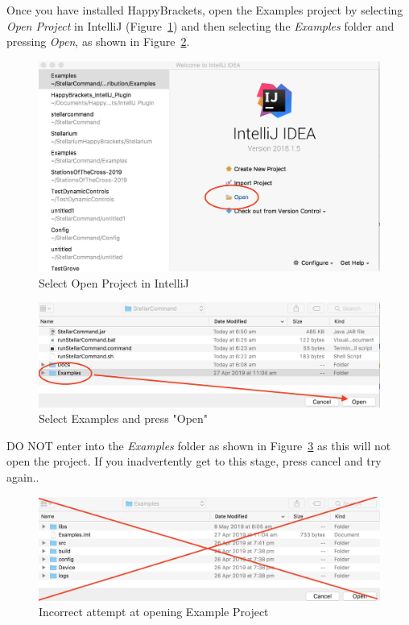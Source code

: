 Once you have installed HappyBrackets, open the Examples project by selecting \textit{Open Project} in IntelliJ (Figure~\ref{fig:openproject}) and then selecting the \textit{Examples} folder and pressing \textit{Open}, as shown in Figure~\ref{fig:selectproject}.

\begin{figure}[htbp]
	\centering
	\includegraphics[width=1\columnwidth]{openproject}
	\caption{Select Open Project in IntelliJ}
	\label{fig:openproject}
\end{figure}

\begin{figure}[htbp]
	\centering
	\includegraphics[width=1\columnwidth]{selectproject}
	\caption{Select Examples and press "Open"}
	\label{fig:selectproject}
\end{figure}

DO NOT enter into the \textit{Examples} folder as shown in Figure~\ref{fig:badopen} as this will not open the project. If you inadvertently get to this stage, press cancel and try again.. 

\begin{figure}[htbp]
	\centering
	\includegraphics[width=1\columnwidth]{badopen}
	\caption{Incorrect attempt at opening Example Project}
	\label{fig:badopen}
\end{figure}





